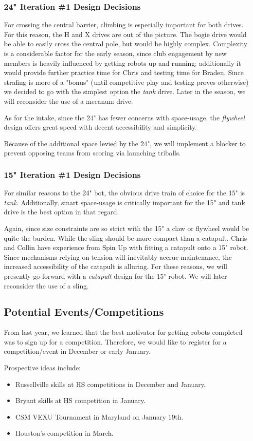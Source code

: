 \subsubsection{24" Iteration \#1 Design Decisions}
For crossing the central barrier, climbing is especially important for both
drives. For this reason, the H and X drives are out of the picture. The bogie
drive would be able to easily cross the central pole, but would be highly
complex. Complexity is a considerable factor for the early season, since club
engagement by new members is heavily influenced by getting robots up and
running; additionally it would provide further practice time for Chris and
testing time for Braden. Since strafing is more of a "bonus" (until competitive
play and testing proves otherwise) we decided to go with the simplest option the
\textit{tank} drive. Later in the season, we will reconsider the use of a
mecanum drive. \par As for the intake, since the 24" has fewer concerns with
space-usage, the \textit{flywheel} design offers great speed with decent
accessibility and simplicity. \par Because of the additional space levied by the
24", we will implement a blocker to prevent opposing teams from scoring via
launching triballs.
\subsubsection{15" Iteration \#1 Design Decisions}
For similar reasons to the 24" bot, the obvious drive train of choice for the
15" is \textit{tank}. Additionally, smart space-usage is critically important
for the 15" and tank drive is the best option in that regard. \par Again, since
size constraints are so strict with the 15" a claw or flywheel would be quite
the burden. While the sling should be more compact than a catapult, Chris and
Collin have experience from Spin Up with fitting a catapult onto a 15" robot.
Since mechanisms relying on tension will inevitably accrue maintenance, the
increased accessibility of the catapult is alluring. For these reasons, we will
presently go forward with a \textit{catapult} design for the 15" robot. We will
later reconsider the use of a sling.

\subsection{Potential Events/Competitions}
From last year, we learned that the best motivator for getting robots completed
was to sign up for a competition. Therefore, we would like to register for a
competition/event in December or early January. \par Prospective ideas include:
\begin{itemize}
      \item Russellville skills at HS competitions in December and January.
      \item Bryant skills at HS competition in January.
      \item CSM VEXU Tournament in Maryland on January 19th.
      \item Houston's competition in March.
\end{itemize}


